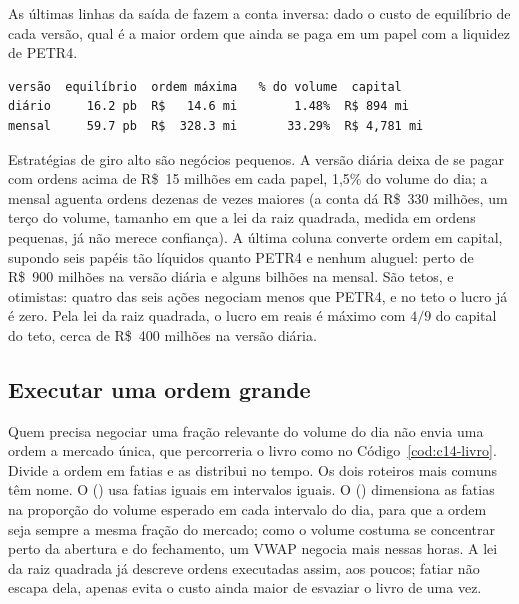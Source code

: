 
As últimas linhas da saída de  fazem a conta inversa: dado o custo de equilíbrio de cada versão, qual é a maior ordem que ainda se paga em um papel com a liquidez de PETR4.

\begin{lstlisting}[style=saida]
versão  equilíbrio  ordem máxima   % do volume  capital
diário     16.2 pb  R$   14.6 mi        1.48%  R$ 894 mi
mensal     59.7 pb  R$  328.3 mi       33.29%  R$ 4,781 mi
\end{lstlisting}

Estratégias de giro alto são negócios pequenos. A versão diária deixa de se pagar com ordens acima de R\$~15 milhões em cada papel, 1,5\% do volume do dia; a mensal aguenta ordens dezenas de vezes maiores (a conta dá R\$~330 milhões, um terço do volume, tamanho em que a lei da raiz quadrada, medida em ordens pequenas, já não merece confiança). A última coluna converte ordem em capital, supondo seis papéis tão líquidos quanto PETR4 e nenhum aluguel: perto de R\$~900 milhões na versão diária e alguns bilhões na mensal. São tetos, e otimistas: quatro das seis ações negociam menos que PETR4, e no teto o lucro já é zero. Pela lei da raiz quadrada, o lucro em reais é máximo com $4/9$ do capital do teto, cerca de R\$~400 milhões na versão diária.

\subsection{Executar uma ordem grande}

Quem precisa negociar uma fração relevante do volume do dia não envia uma ordem a mercado única, que percorreria o livro como no Código~\ref{cod:c14-livro}. Divide a ordem em fatias e as distribui no tempo. Os dois roteiros mais comuns têm nome. O  () usa fatias iguais em intervalos iguais. O  () dimensiona as fatias na proporção do volume esperado em cada intervalo do dia, para que a ordem seja sempre a mesma fração do mercado; como o volume costuma se concentrar perto da abertura e do fechamento, um VWAP negocia mais nessas horas. A lei da raiz quadrada já descreve ordens executadas assim, aos poucos; fatiar não escapa dela, apenas evita o custo ainda maior de esvaziar o livro de uma vez.


